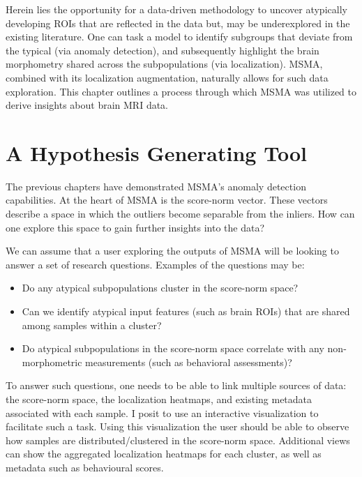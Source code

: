 Herein lies the opportunity for a data-driven methodology to uncover atypically developing ROIs that are reflected in the data but, may be underexplored in the existing  literature. One can task a model to identify subgroups that deviate from the typical (via anomaly detection), and subsequently highlight the brain morphometry shared across the subpopulations (via localization).  MSMA, combined with its localization augmentation, naturally allows for such data exploration. This chapter outlines a process through which MSMA was utilized to derive insights about brain MRI data.

\section{A Hypothesis Generating Tool}

The previous chapters have demonstrated MSMA's anomaly detection capabilities. At the heart of MSMA is the score-norm vector. These vectors describe a space in which the outliers become separable from the inliers. How can one explore this space to gain further insights into the data?

We can assume that a user exploring the outputs of MSMA will be looking to answer a set of research questions. Examples of the questions may be:
\begin{itemize}
    \item Do any atypical subpopulations cluster in the score-norm space?
    \item Can we identify atypical input features (such as brain ROIs)  that are shared among samples within a cluster?
    \item Do atypical subpopulations in the score-norm space correlate with any non-morphometric measurements (such as behavioral assessments)?
\end{itemize}

To answer such questions, one needs to be able to link multiple sources of data: the score-norm space, the localization heatmaps, and existing metadata associated with each sample. I posit to use an interactive visualization to facilitate such a task.
Using this visualization the user should be able to observe how samples are distributed/clustered in the score-norm space. Additional views can show the aggregated localization heatmaps for each cluster, as well as metadata such as behavioural scores.


